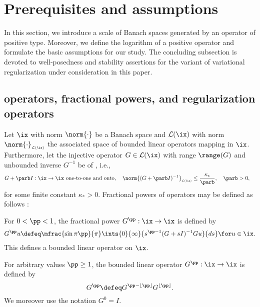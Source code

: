 \documentclass[10pt]{article}
\theoremstyle{definition}
\begin{document}
%

%
\section{Prerequisites and assumptions}
\label{sec:preparations}
%
In this section, we introduce a scale of Banach spaces generated by an operator of positive type. Moreover, we define the logarithm of a positive operator and formulate the basic assumptions for our study.
The concluding subsection is devoted to well-posedness and stability assertions for the variant of variational regularization under consideration in this paper.

\subsection{\Postype operators, fractional powers, and regularization operators}
\label{postype_operators}
Let $ \ix $ with norm $\norm{\cdot}$ be a Banach space and $\mathcal{L}(\ix)$ with norm $\norm{\cdot}_{\scriptscriptstyle \mathcal{L}(\ix)}$ the associated space of bounded linear operators mapping in $\ix$. Furthermore, let the injective operator $ G \in \mathcal{L}(\ix)$ with range $\range(G)$ and unbounded inverse $G^{-1}$ be of \postype, i.e.,
%
\begin{align}
& G + \parb I: \ix \to \ix \ \textup{one-to-one and onto},
\quad \norm{(G + \parb I)^{-1}}_{\scriptscriptstyle \mathcal{L}(\ix)} \le \frac{\kappa_*}{\parb}, \quad \parb > 0,
\label{eq:postype}
\end{align}
%
for some finite constant $ \kappa_* > 0 $.
Fractional powers of \postype operators may be defined as follows
\cite{Balakrishnan59,Balakrishnan60}:
%
\begin{myenumerate_indent}
\item
For $ 0 < \pp < 1 $, the fractional power $ G^\pp : \ix \to \ix $ is defined by
%
\begin{align}
G^\pp u \defeq \mfrac{\sin \pi \pp }{\pi}
\ints{0}{\infty}{s^{\pp-1} (G + sI)^{-1} G u }{ ds}
\for u \in \ix.
\label{eq:frac-power}
\end{align}
%
This defines a bounded linear operator on $ \ix $.

\item
For arbitrary values $ \pp \ge 1 $,
the bounded linear operator $  G^\pp : \ix \to \ix $ is defined by
%
$$
G^\pp  \defeq G^{\pp - \lfloor \pp \rfloor} G^{\lfloor \pp \rfloor}.
$$
%
We moreover use the notation $ G^0 = I $.
\end{myenumerate_indent}
\end{document}
